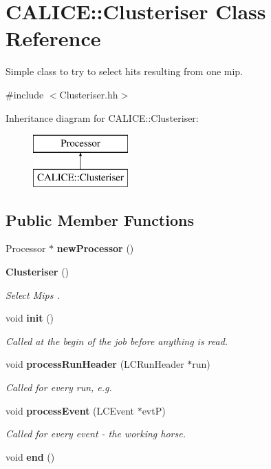 \section{C\-A\-L\-I\-C\-E\-:\-:Clusteriser Class Reference}
\label{classCALICE_1_1Clusteriser}


Simple class to try to select hits resulting from one mip.  




{\ttfamily \#include $<$Clusteriser.\-hh$>$}

Inheritance diagram for C\-A\-L\-I\-C\-E\-:\-:Clusteriser\-:\begin{figure}[H]
\begin{center}
\leavevmode
\includegraphics[height=2.000000cm]{classCALICE_1_1Clusteriser}
\end{center}
\end{figure}
\subsection*{Public Member Functions}
\begin{DoxyCompactItemize}
\item 
Processor $\ast$ {\bfseries new\-Processor} ()\label{classCALICE_1_1Clusteriser_afc7acd77a2c4c6108896d86185534533}

\item 
{\bf Clusteriser} ()
\begin{DoxyCompactList}\small\item\em Select Mips . \end{DoxyCompactList}\item 
void {\bf init} ()
\begin{DoxyCompactList}\small\item\em Called at the begin of the job before anything is read. \end{DoxyCompactList}\item 
void {\bf process\-Run\-Header} (L\-C\-Run\-Header $\ast$run)
\begin{DoxyCompactList}\small\item\em Called for every run, e.\-g. \end{DoxyCompactList}\item 
void {\bf process\-Event} (L\-C\-Event $\ast$evt\-P)\label{classCALICE_1_1Clusteriser_a1970423a42279c703863638f1b8cc298}

\begin{DoxyCompactList}\small\item\em Called for every event -\/ the working horse. \end{DoxyCompactList}\item 
void {\bfseries end} ()\label{classCALICE_1_1Clusteriser_a70d9b2bb4d1be51c3608c0e57b398926}

\end{DoxyCompactItemize}
